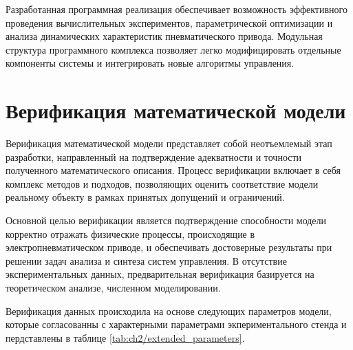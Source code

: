 Разработанная программная реализация обеспечивает возможность эффективного проведения вычислительных экспериментов,
параметрической оптимизации и анализа динамических характеристик пневматического привода. Модульная структура программного
комплекса позволяет легко модифицировать отдельные компоненты системы и интегрировать новые алгоритмы управления.

\section{Верификация математической модели}\label{sec:ch2/sec7}
Верификация математической модели  представляет собой неотъемлемый этап разработки, направленный на подтверждение адекватности
и точности полученного математического описания. Процесс верификации включает в себя комплекс методов и подходов,
позволяющих оценить соответствие модели реальному объекту в рамках принятых допущений и ограничений.

Основной целью верификации является подтверждение способности модели корректно отражать физические процессы,
происходящие в электропневматическом приводе, и обеспечивать достоверные результаты при решении задач анализа и синтеза систем управления.
В отсутствие экспериментальных данных, предварительная верификация базируется на теоретическом анализе,
численном моделировании.

Верификация данных происходила на основе следующих параметров модели, которые согласованны
с характерными параметрами экпериментального стенда и пердставлены в
таблице \ref{tab:ch2/extended_parameters}.

